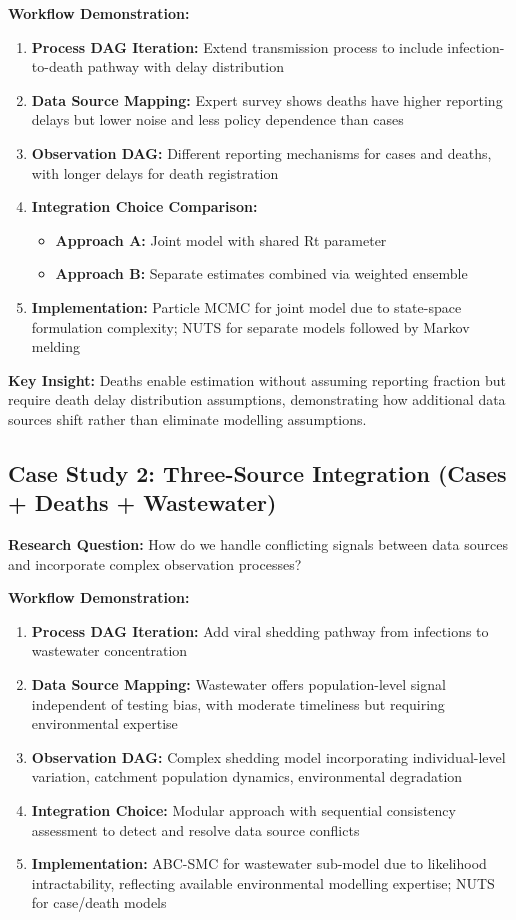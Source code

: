 \documentclass{article}
\begin{document}
\textbf{Workflow Demonstration:}
\begin{enumerate}
    \item \textbf{Process DAG Iteration:} Extend transmission process to include infection-to-death pathway with delay distribution
    \item \textbf{Data Source Mapping:} Expert survey shows deaths have higher reporting delays but lower noise and less policy dependence than cases
    \item \textbf{Observation DAG:} Different reporting mechanisms for cases and deaths, with longer delays for death registration
    \item \textbf{Integration Choice Comparison:} 
        \begin{itemize}
            \item \textbf{Approach A:} Joint model with shared Rt parameter
            \item \textbf{Approach B:} Separate estimates combined via weighted ensemble
        \end{itemize}
    \item \textbf{Implementation:} Particle MCMC for joint model due to state-space formulation complexity; NUTS for separate models followed by Markov melding
\end{enumerate}

\textbf{Key Insight:} Deaths enable estimation without assuming reporting fraction but require death delay distribution assumptions, demonstrating how additional data sources shift rather than eliminate modelling assumptions.

\subsection{Case Study 2: Three-Source Integration (Cases + Deaths + Wastewater)}

\textbf{Research Question:} How do we handle conflicting signals between data sources and incorporate complex observation processes?

\textbf{Workflow Demonstration:}
\begin{enumerate}
    \item \textbf{Process DAG Iteration:} Add viral shedding pathway from infections to wastewater concentration
    \item \textbf{Data Source Mapping:} Wastewater offers population-level signal independent of testing bias, with moderate timeliness but requiring environmental expertise
    \item \textbf{Observation DAG:} Complex shedding model incorporating individual-level variation, catchment population dynamics, environmental degradation
    \item \textbf{Integration Choice:} Modular approach with sequential consistency assessment to detect and resolve data source conflicts
    \item \textbf{Implementation:} ABC-SMC for wastewater sub-model due to likelihood intractability, reflecting available environmental modelling expertise; NUTS for case/death models
\end{enumerate}
\end{document}
